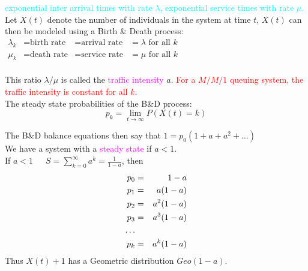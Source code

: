 \documentclass[20pt,landscape]{foils}
\newcommand{\no}{\noindent}
\newcommand \h {\hspace*{.3in}}
\begin{document}
{{\foilhead[-.8in]{\textcolor{blue}{The $M/M/1$ Queue}}\vspace*{1mm}
\no {\textcolor{magenta}{Situation:}} {\textcolor{cyan}{exponential inter arrival times with rate $\lambda$, 
exponential service times with rate $\mu$.}}\\[.1in]
\no Let $X(t)$ denote the number of individuals in the system at time 
$t$, $X(t)$ can then be modeled using a Birth \& Death process:\\[.1in]
\h \h \h $\begin{array}{llll}
   \lambda_{k} & = \text{birth rate} & = \text{arrival rate} & = 
    \lambda \text{ for all } k \\
    \mu_{k} & = \text{death rate} & = \text{service rate} & = 
    \mu \text{ for all } k \\ 
\end{array}$
\vspace*{-.15in}

\no This ratio $\lambda/\mu$ is called the  {\textcolor{magenta}{traffic intensity}} $a$. {\textcolor{red}{For a $M/M/1$ 
queuing system, the traffic intensity is constant for all $k$.}}\\[.3in]
\no The steady state probabilities of the 
B\&D process:
\[p_{k} = \lim_{t \rightarrow \infty}P(X(t) = k)\]

\foilhead[-.8in]{\textcolor{blue}{The $M/M/1$ Queue (cont'd)}}\vspace*{1mm}
\no The B\&D balance equations then say that
 $1 = p_{0}(1 + a + a^{2} + \ldots)$\\[.1in]
\no We have a system with a {\textcolor{magenta}{steady state}} if $a < 1$.\\[.1in]
\no If $a < 1$\ \ \ $S = \sum_{k=0}^{\infty} a^{k} = \frac{1}{1-a}$, then
\begin{eqnarray*}
\addtolength{\itemsep}{-0.8\baselineskip}
    p_{0} &=& 1-a \\
    p_{1} &=& a (1-a) \\
    p_{2} &=& a^{2} (1-a) \\
    p_{3} &=& a^{3} (1-a) \\
    \ldots\\
    p_{k} &=& a^{k} (1-a) 
\end{eqnarray*}
Thus $X(t) + 1$ has a Geometric distribution $Geo(1-a)$.


}}
\end{document}
